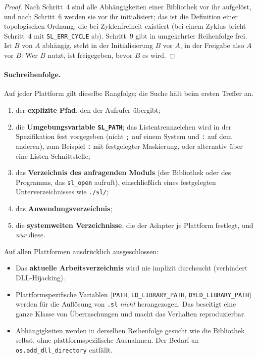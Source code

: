 \begin{proof}
	Nach Schritt~4 sind alle Abhängigkeiten einer Bibliothek vor ihr aufgelöst, und nach Schritt~6 werden sie vor ihr initialisiert; das ist die Definition einer topologischen Ordnung, die bei Zyklenfreiheit existiert (bei einem Zyklus bricht Schritt~4 mit \texttt{SL\_ERR\_CYCLE} ab). Schritt~9 gibt in umgekehrter Reihenfolge frei. Ist $B$ von $A$ abhängig, steht in der Initialisierung $B$ vor $A$, in der Freigabe also $A$ vor $B$: Wer $B$ nutzt, ist freigegeben, bevor $B$ es wird.
\end{proof}

\paragraph{Suchreihenfolge.}
\label{sec:sl_suche}
Auf jeder Plattform gilt dieselbe Rangfolge; die Suche hält beim ersten Treffer an.

\begin{enumerate}
	\item der \textbf{explizite Pfad}, den der Aufrufer übergibt;
	\item die \textbf{Umgebungsvariable \texttt{SL\_PATH}}; das Listentrennzeichen wird in der Spezifikation fest vorgegeben (nicht \texttt{;} auf einem System und \texttt{:} auf dem anderen), zum Beispiel \texttt{:} mit festgelegter Maskierung, oder alternativ über eine Listen-Schnittstelle;
	\item das \textbf{Verzeichnis des anfragenden Moduls} (der Bibliothek oder des Programms, das \texttt{sl\_open} aufruft), einschließlich eines festgelegten Unterverzeichnisses wie \texttt{./sl/};
	\item das \textbf{Anwendungsverzeichnis};
	\item die \textbf{systemweiten Verzeichnisse}, die der Adapter je Plattform festlegt, und \emph{nur} diese.
\end{enumerate}

Auf allen Plattformen ausdrücklich ausgeschlossen:

\begin{itemize}
	\item Das \textbf{aktuelle Arbeitsverzeichnis} wird nie implizit durchsucht (verhindert DLL-Hijacking).
	\item Plattformspezifische Variablen (\texttt{PATH}, \texttt{LD\_LIBRARY\_PATH}, \texttt{DYLD\_LIBRARY\_PATH}) werden für die Auflösung von \texttt{.sl} \emph{nicht} herangezogen. Das beseitigt eine ganze Klasse von Überraschungen und macht das Verhalten reproduzierbar.
	\item Abhängigkeiten werden in derselben Reihenfolge gesucht wie die Bibliothek selbst, ohne plattformspezifische Ausnahmen. Der Bedarf an \texttt{os.add\_dll\_directory} entfällt.
\end{itemize}

